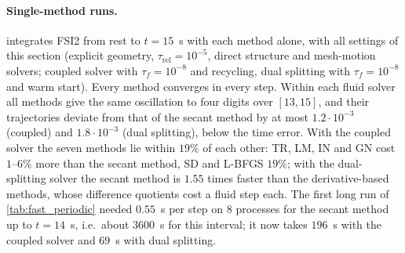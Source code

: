 \documentclass[11pt,a4paper]{article}
\theoremstyle{definition}
\theoremstyle{remark}
\begin{document}
\paragraph{Single-method runs.}  integrates FSI2 from rest to $t=15$~s with each
method alone, with all settings of this section (explicit geometry, $\tau_{\mathrm{rel}}=10^{-5}$,
direct structure and mesh-motion solvers; coupled solver with $\tau_f=10^{-8}$ and recycling, dual
splitting with $\tau_f=10^{-8}$ and warm start). Every method converges in every step. Within each
fluid solver all methods give the same oscillation to four digits over $[13,15]$, and their
trajectories deviate from that of the secant method by at most $1.2\cdot10^{-3}$ (coupled) and
$1.8\cdot10^{-3}$ (dual splitting), below the time error. With the coupled solver the seven methods
lie within $19\%$ of each other: TR, LM, IN and GN cost $1$--$6\%$ more than the secant method, SD
and L-BFGS $19\%$; with the dual-splitting solver the secant method is $1.55$ times faster than the
derivative-based methods, whose difference quotients cost a fluid step each. The first long run
of \cref{tab:fast_periodic} needed $0.55$~s per step on $8$ processes for the secant method up to
$t=14$~s, i.e.\ about $3600$~s for this interval; it now takes $196$~s with the coupled solver and
$69$~s with dual splitting.
\end{document}
